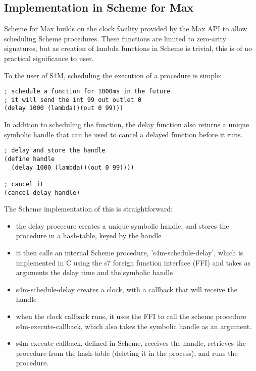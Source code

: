 \documentclass[acmsmall]{acmart}
\begin{document}
\subsection{Implementation in Scheme for Max}

Scheme for Max builds on the clock facility provided by the Max API to allow scheduling
Scheme procedures. These functions are limited to zero-arity signatures, but as
creation of lambda functions in Scheme is trivial, this is of no practical significance to 
user.  

To the user of S4M, scheduling the execution of a procedure is simple:

\begin{verbatim}
; schedule a function for 1000ms in the future
; it will send the int 99 out outlet 0
(delay 1000 (lambda()(out 0 99)))
\end{verbatim}

In addition to scheduling the function, the delay function also returns a unique
symbolic handle that can be used to cancel a delayed function before it runs.

\begin{verbatim}
; delay and store the handle
(define handle 
  (delay 1000 (lambda()(out 0 99))))

; cancel it
(cancel-delay handle)
\end{verbatim}

The Scheme implementation of this is straightforward:
\begin{itemize}
\item the delay procecure creates a unique symbolic handle, and stores the procedure
  in a hash-table, keyed by the handle
\item it then calls an internal Scheme procedure, 's4m-schedule-delay', which is implemented
  in C using the s7 foreign function interface (FFI) and takes as arguments
  the delay time and the symbolic handle
\item s4m-schedule-delay creates a clock, with a callback that will receive the handle
\item when the clock callback runs, it uses the FFI to call the scheme procedure s4m-execute-callback,
  which also takes the symbolic handle as an argument.
\item s4m-execute-callback, defined in Scheme, receives the handle, retrieves the procedure
  from the hash-table (deleting it in the process), and runs the procedure.
\end{itemize}
\end{document}
